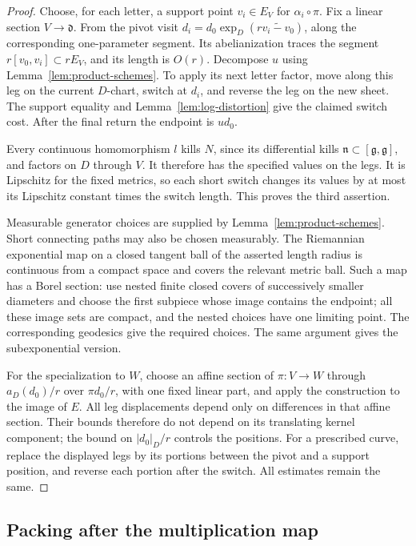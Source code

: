 \begin{proof}
Choose, for each letter, a support point $v_i\in E_V$ for
$\alpha_i\circ\pi$. Fix a linear section $V\to\mathfrak d$.
From the pivot visit
$d_i=d_0\exp_D(r\widetilde{v_i-v_0})$, along the corresponding
one-parameter segment. Its abelianization traces the segment
$r[v_0,v_i]\subset rE_V$, and its length is $O(r)$.
Decompose $u$ using Lemma~\ref{lem:product-schemes}. To apply its
next letter factor, move along this leg on the current $D$-chart,
switch at $d_i$, and reverse the leg on the new sheet. The support
equality and Lemma~\ref{lem:log-distortion} give the claimed switch
cost. After the final return the endpoint is $ud_0$.

Every continuous homomorphism $l$ kills $N$, since its differential
kills $\mathfrak n\subset[\mathfrak g,\mathfrak g]$, and factors
on $D$ through $V$. It therefore has the specified values
on the legs. It is Lipschitz for the fixed metrics, so each short
switch changes its values by at most its Lipschitz constant times
the switch length. This proves the third assertion.

Measurable generator choices are supplied by
Lemma~\ref{lem:product-schemes}. Short connecting paths may also
be chosen measurably. The Riemannian exponential map on a closed
tangent ball of the asserted length radius is continuous from a
compact space and covers the relevant metric ball. Such a map has
a Borel section: use nested finite closed covers of successively
smaller diameters and choose the first subpiece whose image
contains the endpoint; all these image sets are compact, and the
nested choices have one limiting point. The corresponding
geodesics give the required choices. The same argument gives the
subexponential version.

For the specialization to $W$, choose an affine section of
$\pi:V\to W$ through $a_D(d_0)/r$ over $\pi d_0/r$, with one
fixed linear part, and apply the construction to the image of $E$.
All leg displacements depend only on differences in that affine
section. Their bounds therefore do not depend on its translating
kernel component; the bound on $|d_0|_D/r$ controls the positions.
For a prescribed curve, replace the displayed legs by its portions
between the pivot and a support position, and reverse each portion
after the switch. All estimates remain the same.
\end{proof}

\subsection{Packing after the multiplication map}

